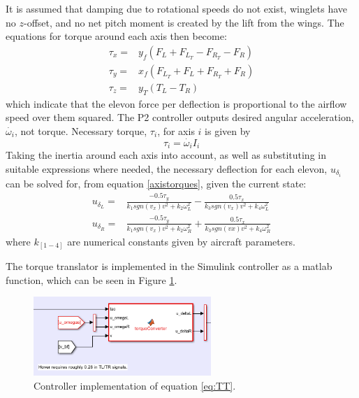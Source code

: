 \documentclass{article}
\begin{document}
It is assumed that damping due to rotational speeds do not exist, winglets have no $z$-offset, and no net pitch moment is created by the lift from the wings.
The equations for torque around each axis then become:
\begin{equation}
\begin{split}
    \tau_x =& y_f ( F_L + F_{L_T} - F_{R_T} -F_R) \\
    \tau_y =& x_f ( F_{L_T} + F_L + F_{R_T} + F_R) \\
    \tau_z =& y_T ( T_L - T_R)
\end{split}
\label{axistorques}
\end{equation}
which indicate that the elevon force per deflection is proportional to the airflow speed over them squared.
The P2 controller outputs desired angular acceleration, $\dot{\omega_i}$, not torque.
Necessary torque, $\tau_i$, for axis $i$ is given by
\begin{equation}
    \tau_i = \dot{\omega_i} I_i
\end{equation}
Taking the inertia around each axis into account, as well as substituting in suitable expressions where needed, the necessary deflection for each elevon, $u_{\delta_i}$ can be solved for, from equation \ref{axistorques}, given the current state:
\begin{equation}
\begin{split}
    u_{\delta_L} =& \frac{-0.5 \tau_y}{k_1 sgn(v_x) v^2 + k_2 \omega_L^2} - \frac{0.5 \tau_x}{k_3 sgn(v_x) v^2 + k_4\omega_L^2} \\
    u_{\delta_R} =& \frac{-0.5 \tau_y}{k_1 sgn(v_x) v^2 + k_2 \omega_R^2} + \frac{0.5 \tau_x}{k_3 sgn(vx) v^2 + k_4 \omega_R^2} 
\end{split}
\label{eq:TT}
\end{equation}
where $k_{[1-4]}$ are numerical constants given by aircraft parameters.

The torque translator is implemented in the Simulink controller as a matlab function, which can be seen in Figure \ref{fig:TT}.
\begin{figure}
    \center
    \includegraphics[width=0.6\textwidth]{TT.PNG}
    \caption{Controller implementation of equation \ref{eq:TT}.}
    \label{fig:TT}
\end{figure}
\end{document}
